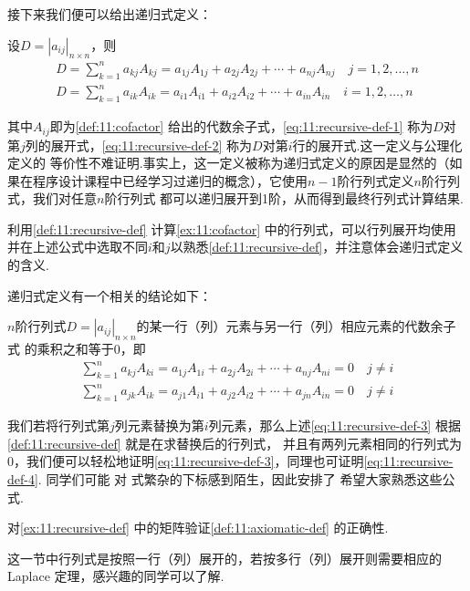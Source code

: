 接下来我们便可以给出递归式定义：
\begin{definition} \label{def:11:recursive-def}
    设$D=|a_{ij}|_{n \times n}$，则
    \begin{gather}
        \label{eq:11:recursive-def-1}
        D=\sum_{k=1}^{n}a_{kj}A_{kj}=a_{1j}A_{1j}+a_{2j}A_{2j}+\cdots+a_{nj}A_{nj} \quad j=1,2,\ldots,n \\
        \label{eq:11:recursive-def-2}
        D=\sum_{k=1}^{n}a_{ik}A_{ik}=a_{i1}A_{i1}+a_{i2}A_{i2}+\cdots+a_{in}A_{in} \quad i=1,2,\ldots,n
    \end{gather}
\end{definition}
其中$A_{ij}$即为\autoref{def:11:cofactor} 给出的代数余子式，\autoref{eq:11:recursive-def-1} 称为$D$对第$j$列的展开式，\autoref{eq:11:recursive-def-2} 称为$D$对第$i$行的展开式.这一定义与公理化定义的
等价性不难证明.事实上，这一定义被称为递归式定义的原因是显然的（如果在程序设计课程中已经学习过递归的概念），它使用$n-1$阶行列式定义$n$阶行列式，我们对任意$n$阶行列式
都可以递归展开到1阶，从而得到最终行列式计算结果.
\begin{example} \label{ex:11:recursive-def}
    利用\autoref{def:11:recursive-def} 计算\autoref{ex:11:cofactor} 中的行列式，可以行列展开均使用并在上述公式中选取不同$i$和$j$以熟悉\autoref*{def:11:recursive-def}，并注意体会递归式定义的含义.
\end{example}

递归式定义有一个相关的结论如下：
\begin{theorem}
    $n$阶行列式$D=|a_{ij}|_{n \times n}$的某一行（列）元素与另一行（列）相应元素的代数余子式
    的乘积之和等于$0$，即
    \begin{gather}
        \label{eq:11:recursive-def-3}
        \sum_{k=1}^{n}a_{kj}A_{ki}=a_{1j}A_{1i}+a_{2j}A_{2i}+\cdots+a_{nj}A_{ni}=0 \quad j \neq i \\
        \label{eq:11:recursive-def-4}
        \sum_{k=1}^{n}a_{jk}A_{ik}=a_{j1}A_{i1}+a_{j2}A_{i2}+\cdots+a_{jn}A_{in}=0 \quad j \neq i
    \end{gather}
\end{theorem}
我们若将行列式第$j$列元素替换为第$i$列元素，那么上述\autoref{eq:11:recursive-def-3} 根据\autoref{def:11:recursive-def} 就是在求替换后的行列式，
并且有两列元素相同的行列式为0，我们便可以轻松地证明\autoref*{eq:11:recursive-def-3}，同理也可证明\autoref*{eq:11:recursive-def-4}. 同学们可能
对 式繁杂的下标感到陌生，因此安排了 希望大家熟悉这些公式.
\begin{example} \label{ex:11:recursive-def-2}
    对\autoref{ex:11:recursive-def} 中的矩阵验证\autoref{def:11:axiomatic-def} 的正确性.
\end{example}
这一节中行列式是按照一行（列）展开的，若按多行（列）展开则需要相应的 Laplace 定理，感兴趣的同学可以了解.
